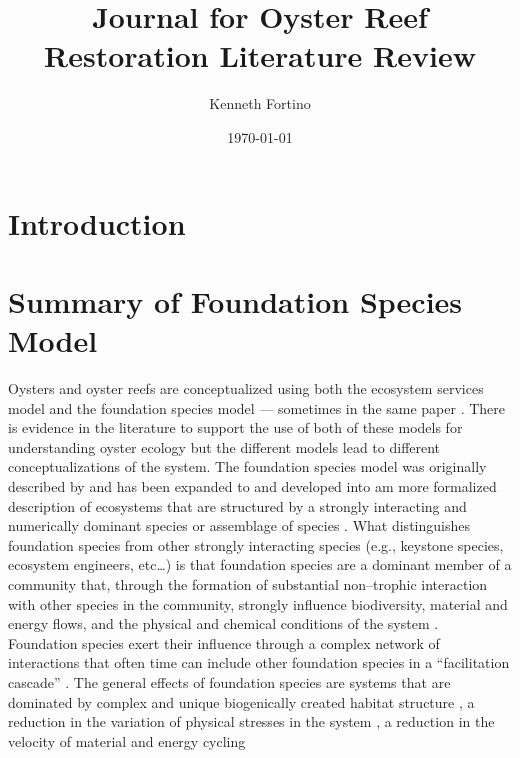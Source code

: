 \documentclass{article}
\begin{document}
\title{Journal for Oyster Reef Restoration Literature Review}
\author{Kenneth Fortino}
\date{\today}

\maketitle

\section{Introduction}


\section{Summary of Foundation Species Model}

Oysters and oyster reefs are conceptualized using both the ecosystem services model and the foundation species model --- sometimes in the same paper \cite{mercaldo-allen_oyster_2023}. There is evidence in the literature to support the use of both of these models for understanding oyster ecology but the different models lead to different conceptualizations of the system. The foundation species model was originally described by  and has been expanded to and developed into am more formalized description of ecosystems that are structured by a strongly interacting and numerically dominant species or assemblage of species \cite{ellison_foundation_2019}. What distinguishes foundation species from other strongly interacting species (e.g., keystone species, ecosystem engineers, etc\ldots) is that foundation species are a dominant member of a community that, through the formation of substantial non--trophic interaction with other species in the community, strongly influence biodiversity, material and energy flows, and the physical and chemical conditions of the system \cite{ellison_foundation_2019}. Foundation species exert their influence through a complex network of interactions that often time can include other foundation species in a ``facilitation cascade'' \cite{angelini_interactions_2011, ellison_foundation_2019, vozzo_cooccuring_2019}. The general effects of foundation species are systems that are dominated by complex and unique biogenically created habitat structure \cite{ellison_loss_2005, ellison_foundation_2019, vozzo_cooccuring_2019, fields_foundation_2022}, a reduction in the variation of physical stresses in the system \cite{ellison_loss_2005, fields_foundation_2022}, a reduction in the velocity of material and energy cycling \cite{ellison_loss_2005, ellison_foundation_2019} %
\end{document}
